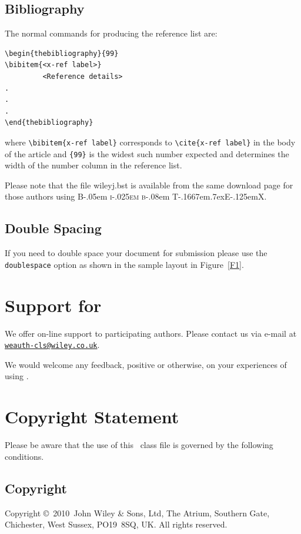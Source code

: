 \documentclass[times]{weauth}
\newcommand\BibTeX{{\rmfamily B\kern-.05em \textsc{i\kern-.025em b}\kern-.08em
T\kern-.1667em\lower.7ex\hbox{E}\kern-.125emX}}
\def\volumeyear{2010}
\begin{document}
\subsection{Bibliography}
The normal commands for producing the reference list are:
\begin{verbatim}
\begin{thebibliography}{99}
\bibitem{<x-ref label>}
         <Reference details>
.
.
.
\end{thebibliography}
\end{verbatim}
where \verb"\bibitem{x-ref label}"
corresponds to \verb"\cite{x-ref label}" in the body of the article
and \verb"{99}" is the widest such number expected and determines
the width of the number column in the reference list.

Please note that the file \textsf{wileyj.bst} is available from
the same download page for those authors using \BibTeX.

\subsection{Double Spacing}
If you need to double space your document for submission please
use the \verb+doublespace+ option as shown in the sample layout in
Figure~\ref{F1}.

\section{Support for \textsf{\journalclass}}
We offer on-line support to participating authors. Please contact
us via e-mail at\\
\href{mailto:weauth-cls@wiley.co.uk}{\texttt{weauth-cls@wiley.co.uk}}.

We would welcome any feedback, positive or otherwise, on your
experiences of using \textsf{\journalclass}.

\section{Copyright Statement}
Please  be  aware that the use of  this \LaTeXe\ class file is
governed by the following conditions.

\subsection{Copyright}
Copyright \copyright\ \volumeyear\ John Wiley \& Sons, Ltd, The
Atrium, Southern Gate, Chichester, West Sussex, PO19~8SQ, UK. All
rights reserved.
\end{document}
